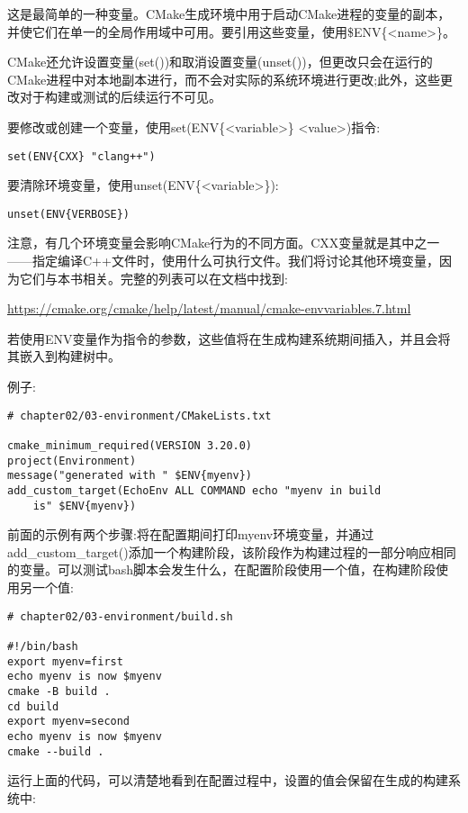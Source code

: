 这是最简单的一种变量。CMake生成环境中用于启动CMake进程的变量的副本，并使它们在单一的全局作用域中可用。要引用这些变量，使用\$ENV\{<name>\}。

CMake还允许设置变量(set())和取消设置变量(unset())，但更改只会在运行的CMake进程中对本地副本进行，而不会对实际的系统环境进行更改;此外，这些更改对于构建或测试的后续运行不可见。

要修改或创建一个变量，使用set(ENV\{<variable>\} <value>)指令:

\begin{lstlisting}[style=styleCMake]
set(ENV{CXX} "clang++")
\end{lstlisting}

要清除环境变量，使用unset(ENV\{<variable>\}):

\begin{lstlisting}[style=styleCMake]
unset(ENV{VERBOSE})
\end{lstlisting}

注意，有几个环境变量会影响CMake行为的不同方面。CXX变量就是其中之一——指定编译C++文件时，使用什么可执行文件。我们将讨论其他环境变量，因为它们与本书相关。完整的列表可以在文档中找到:

\url{https://cmake.org/cmake/help/latest/manual/cmake-envvariables.7.html}

若使用ENV变量作为指令的参数，这些值将在生成构建系统期间插入，并且会将其嵌入到构建树中。

例子:

\begin{lstlisting}[style=styleCMake]
# chapter02/03-environment/CMakeLists.txt

cmake_minimum_required(VERSION 3.20.0)
project(Environment)
message("generated with " $ENV{myenv})
add_custom_target(EchoEnv ALL COMMAND echo "myenv in build
	is" $ENV{myenv})
\end{lstlisting}

前面的示例有两个步骤:将在配置期间打印myenv环境变量，并通过add\_custom\_target()添加一个构建阶段，该阶段作为构建过程的一部分响应相同的变量。可以测试bash脚本会发生什么，在配置阶段使用一个值，在构建阶段使用另一个值:

\begin{lstlisting}[style=stylePython]
# chapter02/03-environment/build.sh
	
#!/bin/bash
export myenv=first
echo myenv is now $myenv
cmake -B build .
cd build
export myenv=second
echo myenv is now $myenv
cmake --build .
\end{lstlisting}

运行上面的代码，可以清楚地看到在配置过程中，设置的值会保留在生成的构建系统中:

